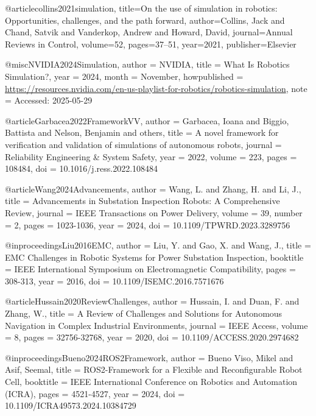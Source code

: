 @article{collins2021simulation,
  title={On the use of simulation in robotics: Opportunities, challenges, and the path forward},
  author={Collins, Jack and Chand, Satvik and Vanderkop, Andrew and Howard, David},
  journal={Annual Reviews in Control},
  volume={52},
  pages={37--51},
  year={2021},
  publisher={Elsevier}
}



@misc{NVIDIA2024Simulation,
  author       = {{NVIDIA}},
  title        = {What Is Robotics Simulation?},
  year         = {2024},
  month        = {November},
  howpublished = {\url{https://resources.nvidia.com/en-us-playlist-for-robotics/robotics-simulation}},
  note         = {Accessed: 2025-05-29}
}

@article{Garbacea2022FrameworkVV,
  author    = {Garbacea, Ioana and Biggio, Battista and Nelson, Benjamin and others},
  title     = {A novel framework for verification and validation of simulations of autonomous robots},
  journal   = {Reliability Engineering & System Safety},
  year      = {2022},
  volume    = {223},
  pages     = {108484},
  doi       = {10.1016/j.ress.2022.108484}
}

@article{Wang2024Advancements,
  author = {Wang, L. and Zhang, H. and Li, J.},
  title = {Advancements in Substation Inspection Robots: A Comprehensive Review},
  journal = {IEEE Transactions on Power Delivery},
  volume = {39},
  number = {2},
  pages = {1023-1036},
  year = {2024},
  doi = {10.1109/TPWRD.2023.3289756}
}

@inproceedings{Liu2016EMC,
  author = {Liu, Y. and Gao, X. and Wang, J.},
  title = {EMC Challenges in Robotic Systems for Power Substation Inspection},
  booktitle = {IEEE International Symposium on Electromagnetic Compatibility},
  pages = {308-313},
  year = {2016},
  doi = {10.1109/ISEMC.2016.7571676}
}

@article{Hussain2020ReviewChallenges,
  author = {Hussain, I. and Duan, F. and Zhang, W.},
  title = {A Review of Challenges and Solutions for Autonomous Navigation in Complex Industrial Environments},
  journal = {IEEE Access},
  volume = {8},
  pages = {32756-32768},
  year = {2020},
  doi = {10.1109/ACCESS.2020.2974682}
}

@inproceedings{Bueno2024ROS2Framework,
  author = {Bueno Viso, Mikel and Asif, Seemal},
  title = {ROS2-Framework for a Flexible and Reconfigurable Robot Cell},
  booktitle = {IEEE International Conference on Robotics and Automation (ICRA)},
  pages = {4521-4527},
  year = {2024},
  doi = {10.1109/ICRA49573.2024.10384729}
}

